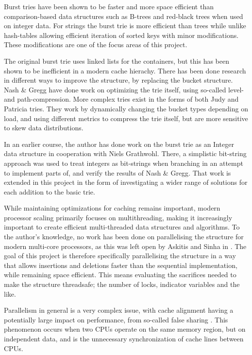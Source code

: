 Burst tries have been shown to be faster and more space efficient than
compari\-son-based data structures such as B-trees and red-black trees when used
on integer data\cite{Nash:2008}. For strings the burst trie is more efficient
than trees\cite{Heinz:2002} while unlike hash-tables allowing efficient iteration
of sorted keys with minor modifications. These modifications are one of the
focus areas of this project.

The original burst trie uses linked lists for the containers, but this has been
shown to be inefficient in a modern cache hierachy. There has been done research
in different ways to improve the structure, by replacing the bucket structure.
Nash \& Gregg have done work on optimizing the trie itself, using so-called
level- and path-compression\cite{Nash:2008}. More complex tries exist in
the forms of both Judy and Patricia tries. They work by dynamically changing
the bucket types depending on load, and using different metrics to compress
the trie itself, but are more sensitive to skew data distributions.

In an earlier course, the author has done work on the burst trie as an Integer
data structure\cite{Wejendorp:2010} in cooperation with Niels Grathwohl. There,
a simplistic bit-string approach was used to treat integers as bit-strings when
branching in an attempt to implement parts of, and verify the results of Nash
\& Gregg\cite{Nash:2008}. That work is extended in this project in the form of
investigating a wider range of solutions for each addition to the basic trie.

While maintaining optimizations for caching remains important, modern processor
scaling primarily focuses on multithreading, making it increasingly important
to create efficient multi-threaded data structures and algorithms. To the
author's knowledge, no work has been done on parallelising the structure for
modern multi-core processors, as this was left open by Askitis and Sinha in
\cite{Askitis:2010}. The goal of this project is therefore specifically
parallelising the structure in a way that allows insertions and deletions
faster than the sequential implementation, while remaining space
efficient\cite{Askitis:2010}. This means evaluating the sacrifices needed to
make the structure threadsafe; the number of locks, indicator variables and the
like.

Parallelism in general is a very complex issue, with cache alignment having a
potentially large impact on performance, from so-called false sharing
\cite{Shavit:2011}. This phenomenon occurs when two CPUs operate on the same
memory region, but on independent data, and is the unnecessary synchronization
of cache lines between CPUs.

